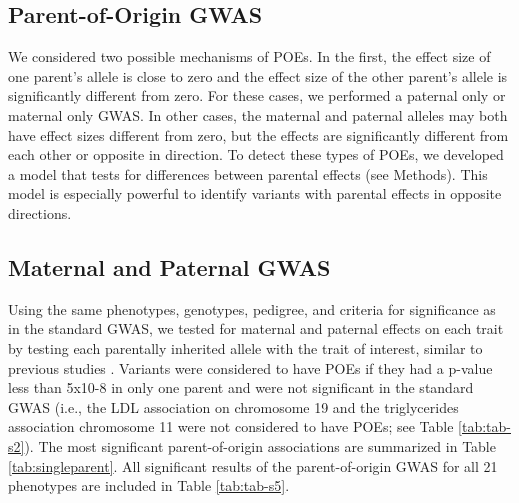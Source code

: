 \subsection{Parent-of-Origin GWAS}\label{Parent-of-Origin GWAS}
We considered two possible mechanisms of POEs. In the first, the effect size of one parent's allele is close to zero and the effect size of the other parent's allele is significantly different from zero. For these cases, we performed a paternal only or maternal only GWAS. In other cases, the maternal and paternal alleles may both have effect sizes different from zero, but the effects are significantly different from each other or opposite in direction. To detect these types of POEs, we developed a model that tests for differences between parental effects (see Methods). This model is especially powerful to identify variants with parental effects in opposite directions.

\subsection{Maternal and Paternal GWAS}\label{Maternal and Paternal GWAS}
Using the same phenotypes, genotypes, pedigree, and criteria for significance as in the standard GWAS, we tested for maternal and paternal effects on each trait by testing each parentally inherited allele with the trait of interest, similar to previous studies \citep{Kong:2009kk,Zoledziewska:2015do,Garg2012a}. Variants were considered to have POEs if they had a p-value less than 5x10-8 in only one parent and were not significant in the standard GWAS (i.e., the LDL association on chromosome 19 and the triglycerides association chromosome 11 were not considered to have POEs; see Table \ref{tab:tab-s2}). The most significant parent-of-origin associations are summarized in Table \ref{tab:singleparent}. All significant results of the parent-of-origin GWAS for all 21 phenotypes are included in Table \ref{tab:tab-s5}. 


